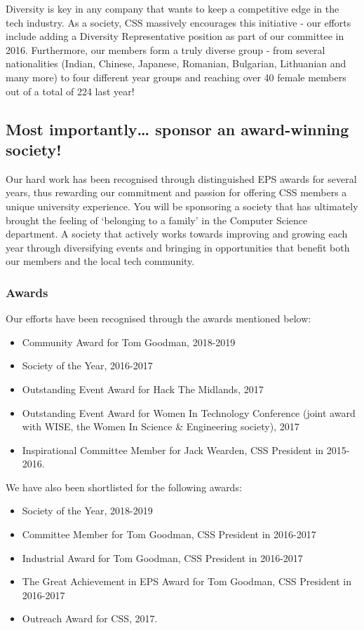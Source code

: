 \documentclass{article}
\begin{document}
Diversity is key in any company that wants to keep a competitive edge in the tech industry. As a society, CSS massively encourages this initiative - our efforts include adding a Diversity Representative position as part of our committee in 2016. 
Furthermore, our members form a truly diverse group - from several nationalities (Indian, Chinese, Japanese, Romanian, Bulgarian, Lithuanian and many more) to four different year groups and reaching over 40 female members out of a total of 224 last year! 

\subsection*{Most importantly… sponsor an award-winning society!}

Our hard work has been recognised through distinguished EPS awards for several years, thus rewarding our commitment and passion for offering CSS members a unique university experience. 
You will be sponsoring a society that has ultimately brought the feeling of ‘belonging to a family’ in the Computer Science department.
A society that actively works towards improving and growing each year through diversifying events and bringing in opportunities that benefit both our members and the local tech community.

\subsubsection*{Awards}

\noindent Our efforts have been recognised through the awards mentioned below:

\begin{itemize}
  \item Community Award for Tom Goodman, 2018-2019
  \item Society of the Year, 2016-2017
  \item Outstanding Event Award for Hack The Midlands, 2017
  \item Outstanding Event Award for Women In Technology Conference (joint award with WISE, the Women In Science \& Engineering society), 2017
  \item Inspirational Committee Member for Jack Wearden, CSS President in 2015-2016.
\end{itemize}

\medskip

\noindent We have also been shortlisted for the following awards:
\begin{itemize}
  \item Society of the Year, 2018-2019
  \item Committee Member for Tom Goodman, CSS President in 2016-2017
  \item Industrial Award for Tom Goodman, CSS President in 2016-2017
  \item The Great Achievement in EPS Award for Tom Goodman, CSS President in 2016-2017
  \item Outreach Award for CSS, 2017.
\end{itemize}
\end{document}
